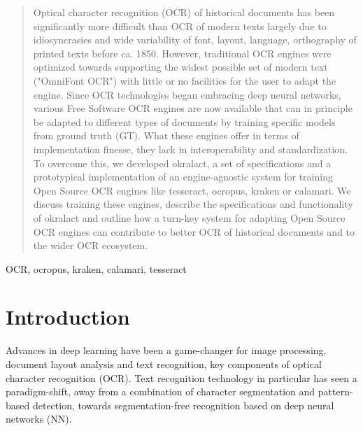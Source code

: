 \documentclass[conference]{IEEEtran}
\begin{document}
\begin{abstract}

Optical character recognition (OCR) of historical documents has
been significantly more difficult than OCR of modern texts
largely due to idiosyncrasies and wide variability of font,
layout, language, orthography of printed texts before ca.
1850. However, traditional OCR engines were optimized towards
supporting the widest possible set of modern text ("OmniFont
OCR") with little or no facilities for the user to adapt the
engine. Since OCR technologies began embracing deep neural
networks, various Free Software OCR engines are now available
that can in principle be adapted to different types of
documents by training specific models from ground truth (GT).
What these engines offer in terms of implementation finesse,
they lack in interoperability and standardization. To overcome
this, we developed okralact, a set of specifications and a
prototypical implementation of an engine-agnostic system for
training Open Source OCR engines like tesseract, ocropus,
kraken or calamari. We discuss training these engines, describe
the specifications and functionality of okralact and outline
how a turn-key system for adapting Open Source OCR engines can
contribute to better OCR of historical documents and to the
wider OCR ecosystem.

\end{abstract}

\begin{IEEEkeywords}
OCR, ocropus, kraken, calamari, tesseract
\end{IEEEkeywords}

\section{Introduction}


Advances in deep learning have been a game-changer for image
processing, document layout analysis and text recognition, key components of optical
character recognition (OCR). Text recognition technology in
particular has seen a paradigm-shift, away from a combination of character
segmentation and pattern-based detection, towards
segmentation-free recognition based on deep neural networks (NN).
\end{document}
